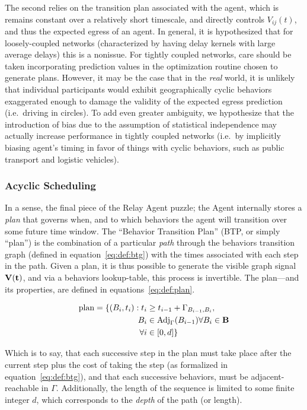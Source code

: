 \documentclass{report}
\begin{document}
The second relies on the transition plan associated with the agent, which is remains constant over a relatively short timescale, and directly controls $V_{ij}(t)$, and thus the expected egress of an agent.
In general, it is hypothesized that for loosely-coupled networks (characterized by having delay kernels with large average delays) this is a nonissue.
For tightly coupled networks, care should be taken incorporating prediction values in the optimization routine chosen to generate plans.
However, it may be the case that in the \emph{real} world, it is unlikely that individual participants would exhibit geographically cyclic behaviors exaggerated enough to damage the validity of the expected egress prediction (i.e.\ driving in circles).
To add even greater ambiguity, we hypothesize that the introduction of bias due to the assumption of statistical independence may actually increase performance in tightly coupled networks (i.e.\ by implicitly biasing agent's timing in favor of things with cyclic behaviors, such as public transport and logistic vehicles).

\subsubsection{Acyclic Scheduling}
\label{seq:def:plan}

In a sense, the final piece of the Relay Agent puzzle; the Agent internally stores a \emph{plan} that governs when, and to which behaviors the agent will transition over some future time window.
The ``Behavior Transition Plan'' (BTP, or simply ``plan'') is the combination of a particular \emph{path} through the behaviors transition graph (defined in equation~\eqref{eq:def:btg}) with the times associated with each step in the path.
Given a plan, it is thus possible to generate the visible graph signal $\bf{V}(t)$, and via a behaviors lookup-table, this process is invertible.
The plan---and its properties, are defined in equations~\eqref{eq:def:plan}.

\begin{align}\label{eq:def:plan}
	\mbox{plan} = \{(B_i, t_i) : t_{i} &\geq t_{i-1} + \Gamma_{B_{i-1},B_i},\\
	B_i &\in \mbox{Adj}_\Gamma(B_{i-1}) \forall B_i \in \bf{B}\\
	\forall i &\in [0, d]\}
\end{align}

Which is to say, that each successive step in the plan must take place after the current step plus the cost of taking the step (as formalized in equation~\eqref{eq:def:btg}), and that each successive behaviors, must be adjacent-reachable in $\Gamma$.
Additionally, the length of the sequence is limited to some finite integer $d$, which corresponds to the \emph{depth} of the path (or length).
\end{document}
